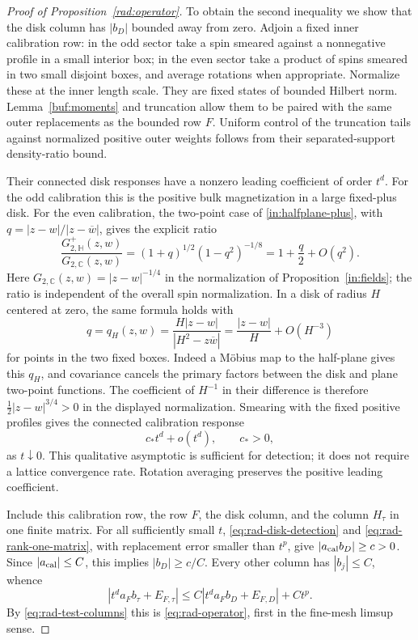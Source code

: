 \begin{proof}[Proof of Proposition~\ref{rad:operator}]
To obtain the second inequality we show that the disk column has
$|b_D|$ bounded away from zero.  Adjoin a fixed inner calibration
row: in the odd sector take a spin smeared against a nonnegative
profile in a small interior box; in the even sector take a product
of spins smeared in two small disjoint boxes, and average rotations
when appropriate.  Normalize these at the inner length scale.
They are fixed states of bounded Hilbert norm.  Lemma~\ref{buf:moments}
and truncation allow them to be paired with the same outer
replacements as the bounded row $F$.  Uniform control of the
truncation tails against normalized positive outer weights follows
from their separated-support density-ratio bound.

Their connected disk responses have a nonzero leading coefficient
of order $t^d$.  For the odd calibration this is the positive bulk
magnetization in a large fixed-plus disk.  For the even calibration,
the two-point case of \eqref{in:halfplane-plus}, with
$q=|z-w|/|z-\overline w|$, gives the explicit ratio
\[
 \frac{G_{2,\mathbb H}^{+}(z,w)}{G_{2,\mathbb C}(z,w)}
   =(1+q)^{1/2}(1-q^2)^{-1/8}
   =1+\frac q2+O(q^2).
\]
Here $G_{2,\mathbb C}(z,w)=|z-w|^{-1/4}$ in the normalization of
Proposition~\ref{in:fields}; the ratio is independent of the overall
spin normalization.  In a disk of radius $H$ centered at zero, the
same formula holds with
\[
 q=q_H(z,w)=\frac{H|z-w|}{|H^2-z\overline w|}
           =\frac{|z-w|}{H}+O(H^{-3})
\]
for points in the two fixed boxes.  Indeed a M\"obius map to the
half-plane gives this $q_H$, and covariance cancels the primary
factors between the disk and plane two-point functions.  The
coefficient of $H^{-1}$ in their difference is therefore
$\tfrac12|z-w|^{3/4}>0$ in the displayed normalization.  Smearing
with the fixed positive profiles gives the connected calibration response
\begin{equation}
                  c_*t^d+o(t^d),\qquad c_*>0,
 \label{eq:rad-disk-detection}
\end{equation}
as $t\downarrow0$.  This qualitative asymptotic is sufficient for
detection; it does not require a lattice convergence rate.
Rotation averaging preserves the positive leading coefficient.

Include this calibration row, the row $F$, the disk column, and
the column $H_\tau$ in one finite matrix.  For all sufficiently
small $t$, \eqref{eq:rad-disk-detection} and
\eqref{eq:rad-rank-one-matrix}, with replacement error smaller
than $t^p$, give
$|a_{\rm cal}b_D|\geq c>0$.  Since
$|a_{\rm cal}|\leq C$, this implies $|b_D|\geq c/C$.
Every other column has $|b_j|\leq C$, whence
\[
        |t^d a_Fb_\tau+E_{F,\tau}|
             \leq C|t^d a_Fb_D+E_{F,D}|+Ct^p.
\]
By \eqref{eq:rad-test-columns} this is
\eqref{eq:rad-operator}, first in the fine-mesh limsup sense.


\end{proof}
